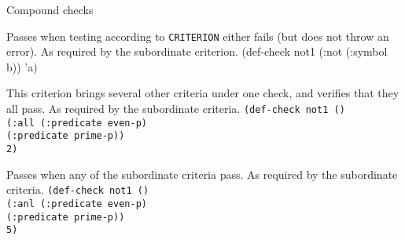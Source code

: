 \begin{criteriaGroup}{Compound checks}

{Passes when testing according to \texttt{CRITERION} either fails (but
does not throw an error).}
{As required by the subordinate criterion.}
{\singleEx}{(def-check not1 (:not (:symbol b)) 'a)}

{This criterion brings several other criteria under one check, and
verifies that they all pass.}
{As required by the subordinate criteria.}
{\tabbingEx}{\texttt{(de}\=\texttt{f-}\=\texttt{check not1 ()}
\\ \>\>\texttt{(:all }\=\texttt{(:predicate even-p)}
\\ \>\>\>\texttt{(:predicate prime-p))}
\\ \>\texttt{2)}}

{Passes when any of the subordinate criteria pass.}
{As required by the subordinate criteria.}
{\tabbingEx}{
\texttt{(de}\=\texttt{f-}\=\texttt{check not1 ()}
\\ \>\>\texttt{(:anl }\=\texttt{(:predicate even-p)}
\\ \>\>\>\texttt{(:predicate prime-p))}
\\ \>\texttt{5)}}

\end{criteriaGroup}
